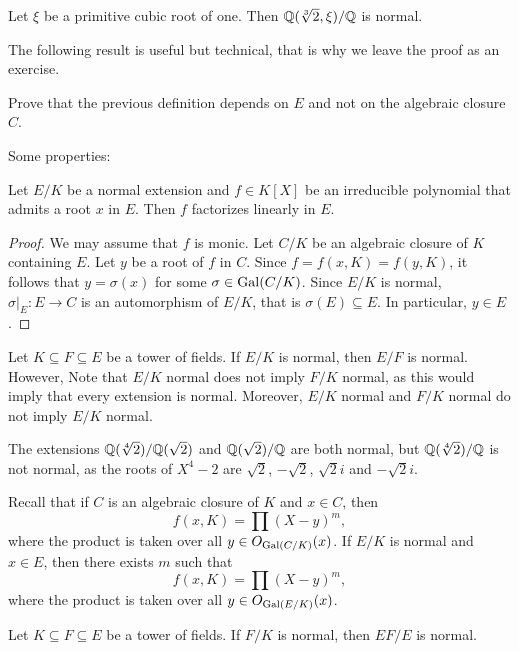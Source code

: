 \begin{exercise}
    Let $\xi$ be a primitive cubic root of one. Then 
    $\mathbb{Q}(\sqrt[3]{2},\xi)/\mathbb{Q}$ is normal. 
\end{exercise}

The following result is useful but technical, that is why we leave the proof
as an exercise. 

\begin{exercise}
    Prove that the previous definition depends on $E$ and not on the
    algebraic closure $C$. 
\end{exercise}

Some properties:

\begin{proposition}
    Let $E/K$ be a normal extension and $f\in K[X]$ be an irreducible polynomial
    that admits a root $x$ in $E$. Then $f$ factorizes
    linearly in $E$.
\end{proposition}

\begin{proof}
    We may assume that $f$ is monic. Let $C/K$ be an algebraic closure of $K$ containing $E$. 
    Let $y$ be a root of $f$ in $C$. Since $f=f(x,K)=f(y,K)$, 
    it follows that $y=\sigma(x)$ for some $\sigma\in\operatorname{Gal}(C/K)$. Since 
    $E/K$ is normal, $\sigma|_E\colon E\to C$ is an automorphism of $E/K$, that is
    $\sigma(E)\subseteq E$. In particular, $y\in E$. 
\end{proof}

Let $K\subseteq F\subseteq E$ be a tower of fields. 
If $E/K$ is normal, then $E/F$ is normal. However, 
Note that $E/K$ normal does not imply $F/K$ normal, as this would imply 
that every extension is normal. Moreover, 
$E/K$ normal and $F/K$ normal do not imply $E/K$ normal.
    
\begin{example}
The extensions $\mathbb{Q}(\sqrt[4]{2})/\mathbb{Q}(\sqrt{2})$ and $\mathbb{Q}(\sqrt{2})/\mathbb{Q}$ are both
normal, but $\mathbb{Q}(\sqrt[4]{2})/\mathbb{Q}$ is not normal, 
as the roots of $X^4-2$ are
$\sqrt{2}$, $-\sqrt{2}$, $\sqrt{2}i$ and $-\sqrt{2}i$.
\end{example}


Recall that if $C$ is an algebraic closure of $K$ and $x\in C$,
then 
\[
f(x,K)=\prod(X-y)^m,
\]
where the product is taken over all 
$y\in O_{\operatorname{Gal}(C/K)}(x)$. 
If $E/K$ is normal and $x\in E$, then there exists $m$ such that 
\[
f(x,K)=\prod(X-y)^m,
\]
where the product is taken over all 
$y\in O_{\operatorname{Gal}(E/K)}(x)$. 

\begin{proposition}
    Let $K\subseteq F\subseteq E$ be a tower of fields. If $F/K$ 
    is normal, then $EF/E$ is normal.
\end{proposition}

